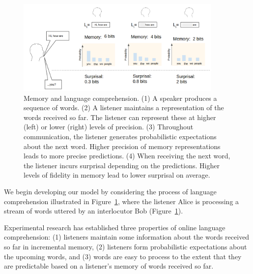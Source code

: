 
\begin{figure}
\centering
\includegraphics[width=0.9\textwidth]{figures-gdrive/communication.png}
	\caption{Memory and language comprehension. (1) A speaker produces a sequence of words. (2) A listener maintains a representation of the words received so far. The listener can represent these at higher (left) or lower (right) levels of precision. (3) Throughout communication, the listener generates probabilistic expectations about the next word. Higher precision of memory representations leads to more precise predictions. (4) When receiving the next word, the listener incurs surprisal depending on the predictions. Higher levels of fidelity in memory lead to lower surprisal on average.  }
	\label{fig:communication}
\end{figure}

We begin developing our model by considering the process of language comprehension illustrated in Figure~\ref{fig:communication}, where the listener Alice is processing a stream of words uttered by an interlocutor Bob (Figure~\ref{fig:communication}). 

Experimental research has established three properties of online language comprehension: (1) listeners maintain some information about the words received so far in incremental memory, (2) listeners form probabilistic expectations about the upcoming words, and (3) words are easy to process to the extent that they are predictable based on a listener's memory of words received so far.

